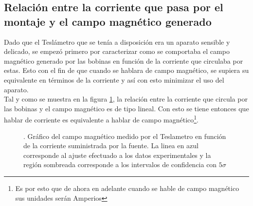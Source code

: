 \documentclass[%
 reprint,
 amsmath,amssymb,
 aps,
]{revtex4-1}
\begin{document}
\subsection{Relación entre la corriente que pasa por el montaje y el campo magnético generado}
Dado que el Teslámetro que se tenía a disposición era un aparato sensible y delicado, se empezó primero por caracterizar como se comportaba el campo magnético generado por las bobinas en función de la corriente que circulaba por estas. Esto con el fin de que cuando se hablara de campo magnético, se supiera su equivalente en términos de la corriente y así con esto minimizar el uso del aparato.\\
Tal y como se muestra en la figura \ref{Calibracion}, la relación entre la corriente que circula por las bobinas y el campo magnético es de tipo lineal. Con esto se tiene entonces que hablar de corriente es equivalente a hablar de campo magnético\footnote{Es por esto que de ahora en adelante cuando se hable de campo magnético sus unidades serán Amperios}.

\begin{figure}[h]
\caption{\label{Calibracion}. Gráfico del campo magnético medido por el Teslametro en función de la corriente suministrada por la fuente. La linea en azul corresponde al ajuste efectuado a los datos experimentales y la región sombreada corresponde a los intervalos de confidencia con $5\sigma$}
\end{figure}
\end{document}
